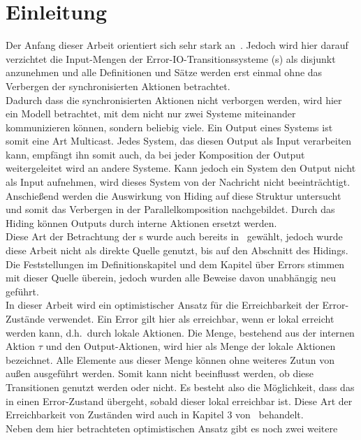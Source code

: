 \chapter{Einleitung}

Der Anfang dieser Arbeit orientiert sich sehr stark an~\cite{Vogler2014EIO}.
Jedoch wird hier darauf verzichtet die Input-Mengen der
Error-IO-Transitionssysteme (\EIO{}s) als disjunkt anzunehmen und alle
Definitionen und Sätze werden erst einmal ohne das Verbergen der
synchronisierten Aktionen betrachtet.\\
Dadurch dass die synchronisierten Aktionen nicht verborgen werden, wird hier
ein Modell betrachtet, mit dem nicht nur zwei Systeme miteinander kommunizieren können,
sondern beliebig viele. Ein Output eines Systems ist somit eine Art Multicast.
Jedes System, das diesen Output als Input verarbeiten kann, empfängt ihn somit auch,
da bei jeder Komposition der Output weitergeleitet wird an andere Systeme.
Kann jedoch ein System den Output nicht als Input aufnehmen, wird dieses System von
der Nachricht nicht beeinträchtigt.\\
Anschießend werden die Auswirkung von Hiding auf diese Struktur
untersucht und somit das Verbergen in der Parallelkomposition nachgebildet.
Durch das Hiding können Outputs durch interne Aktionen ersetzt werden.\\
Diese Art der Betrachtung der
\EIO{}s wurde auch bereits in~\cite{Schlosser2012BA} gewählt, jedoch wurde
diese Arbeit nicht als direkte Quelle genutzt, bis auf den Abschnitt des
Hidings. Die Feststellungen im Definitionskapitel und dem Kapitel über
Errors stimmen mit dieser Quelle überein, jedoch wurden alle Beweise davon unabhängig neu
geführt.\\
In dieser Arbeit wird ein optimistischer Ansatz für die Erreichbarkeit
der Error-Zustände verwendet. Ein Error gilt hier als erreichbar, wenn er lokal erreicht
werden kann, d.h.\ durch lokale Aktionen. Die Menge, bestehend aus der internen
Aktion $\tau$ und den Output-Aktionen, wird hier als Menge der lokale Aktionen
bezeichnet.
Alle Elemente aus dieser Menge können ohne weiteres Zutun von außen ausgeführt
werden. Somit kann nicht beeinflusst werden, ob diese Transitionen genutzt
werden oder nicht. Es besteht also die Möglichkeit, dass das \EIO{} in einen
Error-Zustand übergeht, sobald dieser lokal erreichbar ist. Diese Art der
Erreichbarkeit von Zuständen wird auch in Kapitel 3 von~\cite{Vogler2014EIO}
behandelt.\\
Neben dem hier betrachteten optimistischen Ansatz gibt es noch zwei weitere
